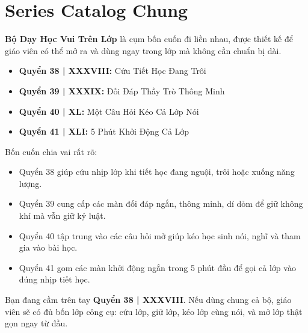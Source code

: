 \chapter*{Series Catalog Chung}

\textbf{Bộ Dạy Học Vui Trên Lớp} là cụm bốn cuốn đi liền nhau, được thiết kế để giáo viên có thể mở ra và dùng ngay trong lớp mà không cần chuẩn bị dài.

\begin{itemize}
\item \textbf{Quyển 38 | XXXVIII:} Cứu Tiết Học Đang Trôi
\item \textbf{Quyển 39 | XXXIX:} Đối Đáp Thầy Trò Thông Minh
\item \textbf{Quyển 40 | XL:} Một Câu Hỏi Kéo Cả Lớp Nói
\item \textbf{Quyển 41 | XLI:} 5 Phút Khởi Động Cả Lớp
\end{itemize}

Bốn cuốn chia vai rất rõ:

\begin{itemize}
\item Quyển 38 giúp cứu nhịp lớp khi tiết học đang nguội, trôi hoặc xuống năng lượng.
\item Quyển 39 cung cấp các màn đối đáp ngắn, thông minh, dí dỏm để giữ không khí mà vẫn giữ kỷ luật.
\item Quyển 40 tập trung vào các câu hỏi mở giúp kéo học sinh nói, nghĩ và tham gia vào bài học.
\item Quyển 41 gom các màn khởi động ngắn trong 5 phút đầu để gọi cả lớp vào đúng nhịp tiết học.
\end{itemize}

Bạn đang cầm trên tay \textbf{Quyển 38 | XXXVIII}. Nếu dùng chung cả bộ, giáo viên sẽ có đủ bốn lớp công cụ: cứu lớp, giữ lớp, kéo lớp cùng nói, và mở lớp thật gọn ngay từ đầu.

